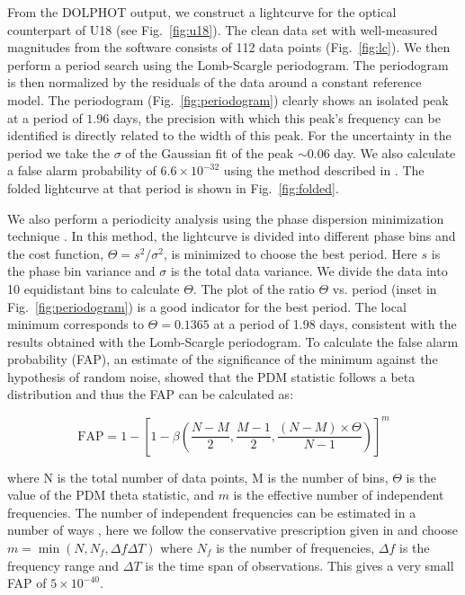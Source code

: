\documentclass[fleqn,usenatbib,useAMS,letters]{mnras}
\begin{document}
 
 
From the DOLPHOT output, we construct a lightcurve for the optical counterpart of U18 (see Fig.~\ref{fig:u18}). The clean data set with well-measured magnitudes from the software consists of 112 data points (Fig.~\ref{fig:lc}). %
We then perform a period search using the Lomb-Scargle \citep{1976Ap&SS..39..447L,1982ApJ...263..835S} periodogram. The periodogram is then normalized by the residuals of the data around a constant reference model. The periodogram %
(Fig.~\ref{fig:periodogram}) clearly shows an isolated peak at a period of $1.96$ days, the precision with which this peak’s frequency can be identified is directly related to the width of this peak. For the uncertainty in the period we take the $\sigma$ of the Gaussian fit of the peak $\sim 0.06$ day. We also calculate a false alarm probability of $6.6\times 10^{-32}$ using the method described in \cite{Baluev}. The folded lightcurve at that period is shown in Fig.~\ref{fig:folded}.




We also perform a periodicity analysis using the phase dispersion minimization technique  \citep[PDM][]{PDMStellingwerf78}. In this method, the lightcurve is divided into different phase bins and the cost function, $\Theta =s^2/\sigma^2$, is minimized to choose the best period. 
Here $s$ is the phase bin variance and $\sigma$ is the total data variance. We divide the data into 10 equidistant bins to calculate $\Theta$. The plot of the ratio $\Theta$ vs. period (inset in Fig.~\ref{fig:periodogram}) is a good indicator for the best  period. %
The local minimum corresponds to $\Theta = 0.1365$ at a period of 1.98 days, consistent with the results obtained with the Lomb-Scargle periodogram. To calculate the false alarm probability (FAP), an estimate of the significance of the minimum against the hypothesis of random noise, \cite{pdmbeta97} showed that the PDM statistic follows a beta distribution and thus the FAP can be calculated as:

$$\text{FAP} = 1-\left [ 1 - \beta\left ( \frac{N-M}{2},\frac{M-1}{2},\frac{(N-M)\times \Theta}{N-1}\right )\right ]^m$$

\noindent where N is the total number of data points, M is the number of bins, $\Theta$ is the value of the PDM theta statistic, and $m$ is the effective number of independent frequencies. The number of independent frequencies can be estimated in a number of ways \citep[e.g.,][]{Nemec1985,HorneLombFreq1986,Cumming2004}, here we follow the conservative prescription given in \cite{GuidePeriodSearch2003}  and choose $m= \min(N, N_f,\Delta f \Delta T)$ where $N_f$ is the number of frequencies, $\Delta f$ is the frequency range and $\Delta T$ is the time span of observations. This gives a very small FAP of  $5\times 10 ^{-40}$.
\end{document}

